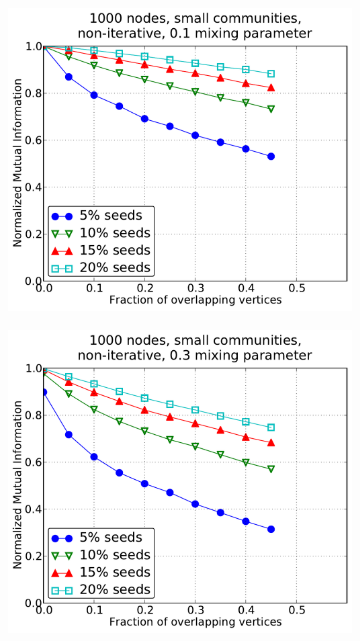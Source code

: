 \begin{figure}[h!]
    \centering
    \begin{subfigure}{0.5\textwidth}
    \centering
    \includegraphics[width=\appplotwidth]{plots/overlap_noniter_1mu_a.pdf}
    \end{subfigure}%
    \begin{subfigure}{0.5\textwidth}
    \centering
    \includegraphics[width=\appplotwidth]{plots/overlap_noniter_3mu_a.pdf}

\end{subfigure}
\end{figure}
